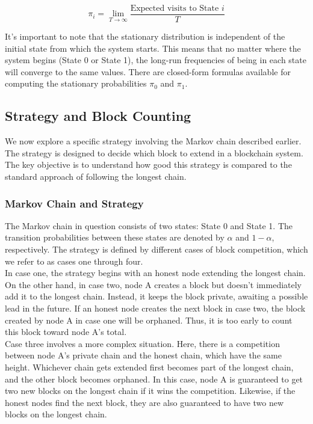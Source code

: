 $$
\pi_i = \lim_{{T \to \infty}} \frac{{\text{Expected visits to State } i}}{{T}}
$$

It's important to note that the stationary distribution is independent of the initial state from which the system starts. This means that no matter where the system begins (State 0 or State 1), the long-run frequencies of being in each state will converge to the same values. There are closed-form formulas available for computing the stationary probabilities $\pi_0$ and $\pi_1$.


\subsection{Strategy and Block Counting}
We now explore a specific strategy involving the Markov chain described earlier. The strategy is designed to decide which block to extend in a blockchain system. The key objective is to understand how good this strategy is compared to the standard approach of following the longest chain.

\subsubsection{Markov Chain and Strategy}
The Markov chain in question consists of two states: State 0 and State 1. The transition probabilities between these states are denoted by $\alpha$ and $1 - \alpha$, respectively. The strategy is defined by different cases of block competition, which we refer to as cases one through four.\\

In case one, the strategy begins with an honest node extending the longest chain. On the other hand, in case two, node A creates a block but doesn't immediately add it to the longest chain. Instead, it keeps the block private, awaiting a possible lead in the future. If an honest node creates the next block in case two, the block created by node A in case one will be orphaned. Thus, it is too early to count this block toward node A's total.\\

Case three involves a more complex situation. Here, there is a competition between node A's private chain and the honest chain, which have the same height. Whichever chain gets extended first becomes part of the longest chain, and the other block becomes orphaned. In this case, node A is guaranteed to get two new blocks on the longest chain if it wins the competition. Likewise, if the honest nodes find the next block, they are also guaranteed to have two new blocks on the longest chain.\\


